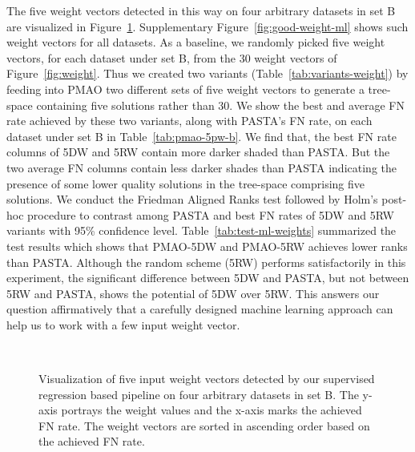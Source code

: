 The five weight vectors detected in this way on four arbitrary datasets in set B are visualized in Figure~\ref{fig:some-good-weight-ml}. Supplementary Figure~\ref{fig:good-weight-ml} shows such weight vectors for all datasets. As a baseline, we randomly picked five weight vectors, for each dataset under set B, from the 30 weight vectors of Figure~\ref{fig:weight}. Thus we created two variants (Table~\ref{tab:variants-weight}) by feeding into PMAO two different sets of five weight vectors to generate a tree-space containing five solutions rather than 30. We show the best and average FN rate achieved by these two variants, along with PASTA's FN rate, on each dataset under set B in Table~\ref{tab:pmao-5pw-b}. We find that, the best FN rate columns of 5DW and 5RW contain more darker shaded than PASTA. But the two average FN columns contain less darker shades than PASTA indicating the presence of some lower quality solutions in the tree-space comprising five solutions. We conduct the Friedman Aligned Ranks test followed by Holm's post-hoc procedure to contrast among PASTA and best FN rates of 5DW and 5RW variants with 95\% confidence level. Table~\ref{tab:test-ml-weights} summarized the test results which shows that PMAO-5DW and PMAO-5RW achieves lower ranks than PASTA. Although the random scheme (5RW) performs satisfactorily in this experiment, the significant difference between 5DW and PASTA, but not between 5RW and PASTA, shows the potential of 5DW over 5RW. This answers our question affirmatively that a carefully designed machine learning approach can help us to work with a few input weight vector.

\begin{figure}[!htbp]%
	\begin{adjustwidth}{-0.6cm}{}
		\centering
		\\
	\end{adjustwidth}
	\caption{Visualization of five input weight vectors detected by our supervised regression based pipeline on four arbitrary datasets in set B. The y-axis portrays the weight values and the x-axis marks the achieved FN rate. The weight vectors are sorted in ascending order based on the achieved FN rate. }
	\label{fig:some-good-weight-ml}
\end{figure}

